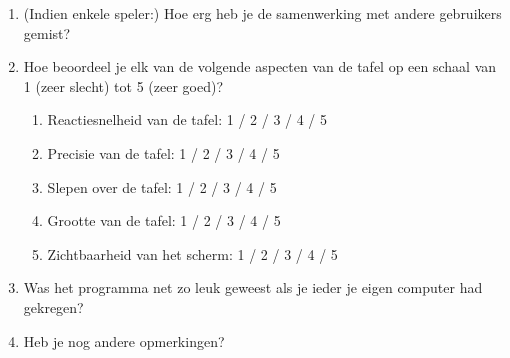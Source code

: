 \documentclass{acm}
\begin{document}
\begin{enumerate}
 \item (Indien enkele speler:) Hoe erg heb je de samenwerking met andere gebruikers gemist?

 \item Hoe beoordeel je elk van de volgende aspecten van de tafel op een schaal van 1 (zeer slecht) tot 5 (zeer goed)? 

  \begin{enumerate}
   \item Reactiesnelheid van de tafel: \tabto{4.5cm}1 / 2 / 3 / 4 / 5
   \item Precisie van de tafel:        \tabto{4.5cm}1 / 2 / 3 / 4 / 5
   \item Slepen over de tafel:         \tabto{4.5cm}1 / 2 / 3 / 4 / 5
   \item Grootte van de tafel:         \tabto{4.5cm}1 / 2 / 3 / 4 / 5
   \item Zichtbaarheid van het scherm: \tabto{4.5cm}1 / 2 / 3 / 4 / 5
  \end{enumerate}

  \item Was het programma net zo leuk geweest als je ieder je eigen computer had gekregen?

  \item Heb je nog andere opmerkingen?
\end{enumerate}
\end{document}
